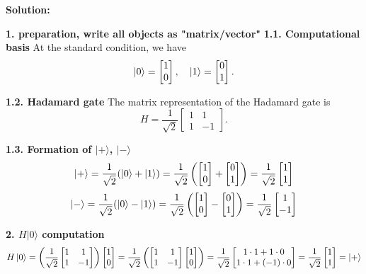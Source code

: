 \documentclass[11pt]{article}
\newenvironment{solution}
{\par\noindent\textbf{Solution:}\par}
{\vspace{1em}}
\begin{document}
\begin{solution}

\textbf{1. preparation, write all objects as "matrix/vector"}
\textbf{1.1. Computational basis}
At the standard condition, we have
\[
\ket{0}=\begin{bmatrix}1\\0\end{bmatrix},\quad
\ket{1}=\begin{bmatrix}0\\1\end{bmatrix}.
\]

\textbf{1.2. Hadamard gate}
The matrix representation of the Hadamard gate is
\[
H = \frac{1}{\sqrt{2}} \begin{bmatrix}1&1\\1&-1\end{bmatrix}.
\]

\textbf{1.3. Formation of $|+\rangle$, $|-\rangle$}
\[
\ket{+} = \frac{1}{\sqrt{2}} (\ket{0} + \ket{1}) = \frac{1}{\sqrt{2}} \left(\begin{bmatrix}1\\0\end{bmatrix} + \begin{bmatrix}0\\1\end{bmatrix}\right) = \frac{1}{\sqrt{2}} \begin{bmatrix}1\\1\end{bmatrix} 
\]
\[
\ket{-} = \frac{1}{\sqrt{2}} (\ket{0} - \ket{1}) = \frac{1}{\sqrt{2}} \left(\begin{bmatrix}1\\0\end{bmatrix} - \begin{bmatrix}0\\1\end{bmatrix}\right) = \frac{1}{\sqrt{2}} \begin{bmatrix}1\\-1\end{bmatrix}
\]

\textbf{2. $H|0\rangle$ computation}
\[
H\ket{0} = \left(\frac{1}{\sqrt{2}} \begin{bmatrix}1&1\\1&-1\end{bmatrix}\right) \begin{bmatrix}1\\0\end{bmatrix} = \frac{1}{\sqrt{2}} \left(\begin{bmatrix}1&1\\1&-1\end{bmatrix} \begin{bmatrix}1\\0\end{bmatrix}\right) = \frac{1}{\sqrt{2}} \begin{bmatrix}1 \cdot 1 + 1 \cdot 0\\1 \cdot 1 + (-1) \cdot 0\end{bmatrix} = \frac{1}{\sqrt{2}} \begin{bmatrix}1\\1\end{bmatrix} = \ket{+}
\]


\end{solution}
\end{document}
